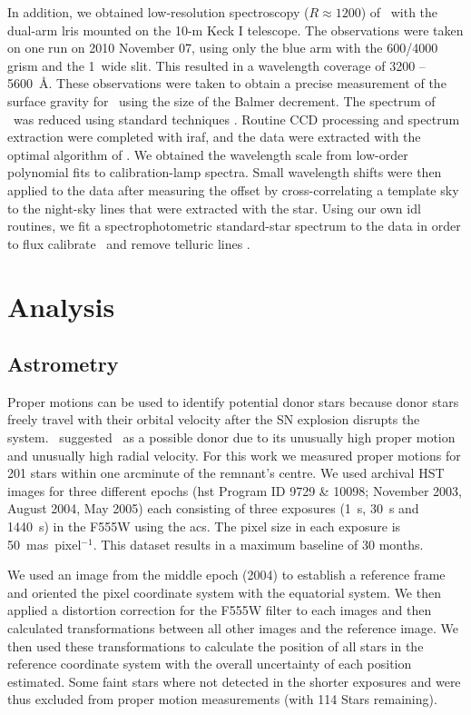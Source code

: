 In addition, we obtained low-resolution spectroscopy ($R\approx1200$) of
\starb\ with the dual-arm \gls{lris} mounted on the 10-m Keck I telescope. The
observations were taken on one run on 2010 November 07, using only the blue
arm with the 600/4000 grism and the 1\arcsec\ wide slit. This resulted
in a wavelength coverage of 3200 -- 5600~\AA. These observations
were taken to obtain a precise  measurement of the surface gravity for \starb\ using the size of the Balmer decrement.
The spectrum of \starb\ was reduced using standard techniques \citep[e.g.][]{Foley03}. Routine CCD processing and spectrum extraction
were completed with \gls{iraf}, and the data were extracted with
the optimal algorithm of \citet{Horne86}. We obtained the wavelength
scale from low-order polynomial fits to calibration-lamp spectra.
Small wavelength shifts were then applied to the data after measuring the offset by
cross-correlating a template sky to the night-sky lines that were
extracted with the star. Using our own \gls{idl} routines, we fit a
spectrophotometric standard-star spectrum to the data in order to flux
calibrate \starb\ and remove telluric lines \citep{Horne86,Matheson00}.


\section{Analysis}
\label{sec:analysis}

\subsection{Astrometry}
\label{sec:propmot}
Proper motions can be used to identify potential donor stars because donor stars freely travel with their orbital velocity after the SN explosion disrupts the system. \rl\ suggested \starg\ as a possible donor due to its unusually high proper motion and unusually high radial velocity. For this work we measured proper motions for 201 stars within one arcminute of the remnant's centre. We used archival HST images for three different epochs (\gls{hst} Program ID  9729 \& 10098; November 2003, August 2004, May 2005) each consisting of three exposures (1~s, 30~s and 1440~s) in the F555W using the \gls{acs}. The pixel size in each exposure is 50~mas~pixel$^{-1}$. This dataset results in a maximum baseline of 30 months. 


We used an image from the middle epoch (2004) to establish a reference frame and oriented the pixel coordinate system with the equatorial system. We then applied a distortion correction for the F555W filter \citep{2006acs..rept....1A} to each images and then calculated transformations between all other images and the reference image. We then used these transformations to calculate the position of all stars in the reference coordinate system  with the overall uncertainty of each position estimated.
Some faint stars where not detected in the shorter exposures and were thus excluded from proper motion measurements (with 114 Stars remaining).

